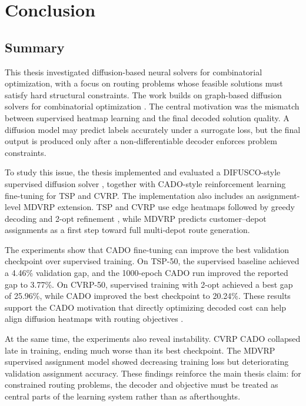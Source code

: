 \chapter{Conclusion}
\label{ch:conclusion}

\section{Summary}
\label{sec:summary}

This thesis investigated diffusion-based neural solvers for combinatorial optimization, with a focus on routing problems whose feasible solutions must satisfy hard structural constraints. The work builds on graph-based diffusion solvers for combinatorial optimization \citep{sun2023difusco}. The central motivation was the mismatch between supervised heatmap learning and the final decoded solution quality. A diffusion model may predict labels accurately under a surrogate loss, but the final output is produced only after a non-differentiable decoder enforces problem constraints.

To study this issue, the thesis implemented and evaluated a DIFUSCO-style supervised diffusion solver \citep{sun2023difusco}, together with CADO-style reinforcement learning fine-tuning \citep{yoon2024cado} for TSP and CVRP. The implementation also includes an assignment-level MDVRP extension. TSP and CVRP use edge heatmaps followed by greedy decoding and 2-opt refinement \citep{croes1958method}, while MDVRP predicts customer--depot assignments as a first step toward full multi-depot route generation.

The experiments show that CADO fine-tuning can improve the best validation checkpoint over supervised training. On TSP-50, the supervised baseline achieved a 4.46\% validation gap, and the 1000-epoch CADO run improved the reported gap to 3.77\%. On CVRP-50, supervised training with 2-opt achieved a best gap of 25.96\%, while CADO improved the best checkpoint to 20.24\%. These results support the CADO motivation that directly optimizing decoded cost can help align diffusion heatmaps with routing objectives \citep{yoon2024cado}.

At the same time, the experiments also reveal instability. CVRP CADO collapsed late in training, ending much worse than its best checkpoint. The MDVRP supervised assignment model showed decreasing training loss but deteriorating validation assignment accuracy. These findings reinforce the main thesis claim: for constrained routing problems, the decoder and objective must be treated as central parts of the learning system rather than as afterthoughts.

